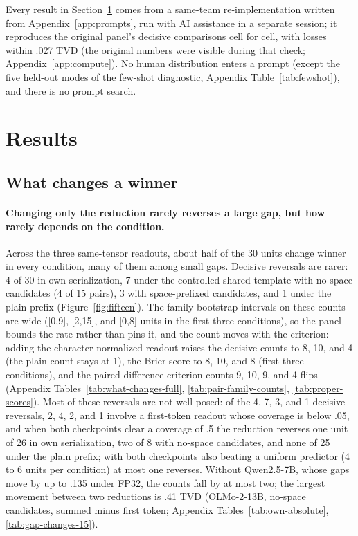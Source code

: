 \documentclass[11pt]{article}
\begin{document}
Every result in Section~\ref{sec:results} comes from a same-team re-implementation written from Appendix~\ref{app:prompts}, run with AI assistance in a separate session; it reproduces the original panel's decisive comparisons cell for cell, with losses within .027 TVD (the original numbers were visible during that check; Appendix~\ref{app:compute}). No human distribution enters a prompt (except the five held-out modes of the few-shot diagnostic, Appendix Table~\ref{tab:fewshot}), and there is no prompt search.

\section{Results}
\label{sec:results}

\subsection{What changes a winner}
\label{sec:reduction}



\paragraph{Changing only the reduction rarely reverses a large gap, but how rarely depends on the condition.} Across the three same-tensor readouts, about half of the 30 units change winner in every condition, many of them among small gaps. Decisive reversals are rarer: 4 of 30 in own serialization, 7 under the controlled shared template with no-space candidates (4 of 15 pairs), 3 with space-prefixed candidates, and 1 under the plain prefix (Figure~\ref{fig:fifteen}). The family-bootstrap intervals on these counts are wide ([0,9], [2,15], and [0,8] units in the first three conditions), so the panel bounds the rate rather than pins it, and the count moves with the criterion: adding the character-normalized readout raises the decisive counts to 8, 10, and 4 (the plain count stays at 1), the Brier score to 8, 10, and 8 (first three conditions), and the paired-difference criterion counts 9, 10, 9, and 4 flips (Appendix Tables~\ref{tab:what-changes-full}, \ref{tab:pair-family-counts}, \ref{tab:proper-scores}). Most of these reversals are not well posed: of the 4, 7, 3, and 1 decisive reversals, 2, 4, 2, and 1 involve a first-token readout whose coverage is below .05, and when both checkpoints clear a coverage of .5 the reduction reverses one unit of 26 in own serialization, two of 8 with no-space candidates, and none of 25 under the plain prefix; with both checkpoints also beating a uniform predictor (4 to 6 units per condition) at most one reverses. Without Qwen2.5-7B, whose gaps move by up to .135 under FP32, the counts fall by at most two; the largest movement between two reductions is .41 TVD (OLMo-2-13B, no-space candidates, summed minus first token; Appendix Tables~\ref{tab:own-absolute}, \ref{tab:gap-changes-15}).
\end{document}
